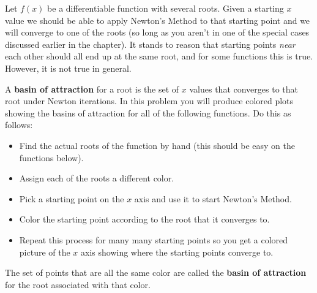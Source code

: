 Let $f(x)$ be a differentiable function with several roots.  Given a starting $x$
value we should be able to apply Newton's Method to that starting point and we will
converge to one of the roots (so long as you aren't in one of the special cases
discussed earlier in the chapter).  It stands to reason that starting points {\it
near} each other should all end up at the same root, and for some functions this is
true.  However, it is not true in general.  

A {\bf basin of attraction} for a root is the set of $x$ values that converges to that
root under Newton iterations.  In this problem you will produce colored plots showing
the basins of attraction for all of the following functions.  Do this as follows:
\begin{itemize}
    \item Find the actual roots of the function by hand (this should be easy on the
        functions below).  
    \item Assign each of the roots a different color.
    \item Pick a starting point on the $x$ axis and use it to start Newton's Method.
    \item Color the starting point according to the root that it converges to.
    \item Repeat this process for many many starting points so you get a colored
        picture of the $x$ axis showing where the starting points converge to.
\end{itemize}
The set of points that are all the same color are called the {\bf basin of attraction}
for the root associated with that color.

